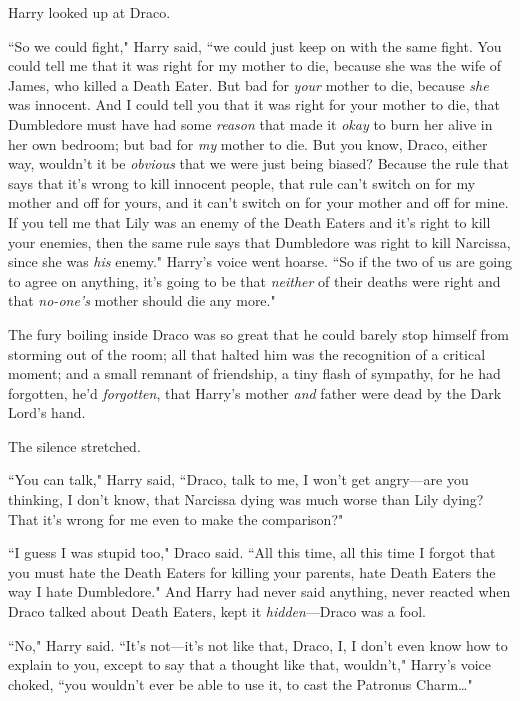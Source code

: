 Harry looked up at Draco.

``So we could fight," Harry said, ``we could just keep on with the same fight. You could tell me that it was right for my mother to die, because she was the wife of James, who killed a Death Eater. But bad for \emph{your} mother to die, because \emph{she} was innocent. And I could tell you that it was right for your mother to die, that Dumbledore must have had some \emph{reason} that made it \emph{okay} to burn her alive in her own bedroom; but bad for \emph{my} mother to die. But you know, Draco, either way, wouldn't it be \emph{obvious} that we were just being biased? Because the rule that says that it's wrong to kill innocent people, that rule can't switch on for my mother and off for yours, and it can't switch on for your mother and off for mine. If you tell me that Lily was an enemy of the Death Eaters and it's right to kill your enemies, then the same rule says that Dumbledore was right to kill Narcissa, since she was \emph{his} enemy." Harry's voice went hoarse. ``So if the two of us are going to agree on anything, it's going to be that \emph{neither} of their deaths were right and that \emph{no-one's} mother should die any more."

\later

The fury boiling inside Draco was so great that he could barely stop himself from storming out of the room; all that halted him was the recognition of a critical moment; and a small remnant of friendship, a tiny flash of sympathy, for he had forgotten, he'd \emph{forgotten}, that Harry's mother \emph{and} father were dead by the Dark Lord's hand.

The silence stretched.

``You can talk," Harry said, ``Draco, talk to me, I won't get angry—are you thinking, I don't know, that Narcissa dying was much worse than Lily dying? That it's wrong for me even to make the comparison?"

``I guess I was stupid too," Draco said. ``All this time, all this time I forgot that you must hate the Death Eaters for killing your parents, hate Death Eaters the way I hate Dumbledore." And Harry had never said anything, never reacted when Draco talked about Death Eaters, kept it \emph{hidden}—Draco was a fool.

``No," Harry said. ``It's not—it's not like that, Draco, I, I don't even know how to explain to you, except to say that a thought like that, wouldn't," Harry's voice choked, ``you wouldn't ever be able to use it, to cast the Patronus Charm{\ldots}"

